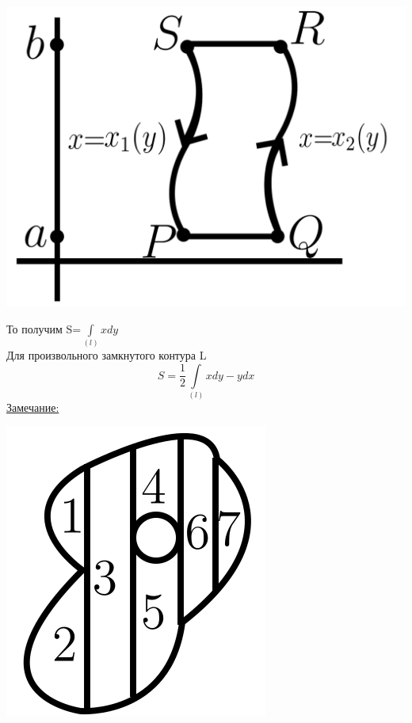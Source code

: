 \documentclass[12pt]{article}
\let\ORIincludegraphics\includegraphics
\renewcommand{\includegraphics}[2][]{\ORIincludegraphics[scale=0.65,#1]{#2}}
\let\oldint\int
\renewcommand{\int}{\oldint\limits}
\begin{document}
  \begin{flushleft}
    \includegraphics[scale=0.4]{8.5.2.png}
  \end{flushleft}
  То получим S=$\int_{(l)}xdy$\\
  Для произвольного замкнутого контура L\\
  \[\boxed{S=\frac{1}{2}\int_{(l)}xdy-ydx}\]
  \underline{Замечание:}
  \begin{flushleft}
      \includegraphics{8.5.3.png}
  \end{flushleft}
\end{document}
